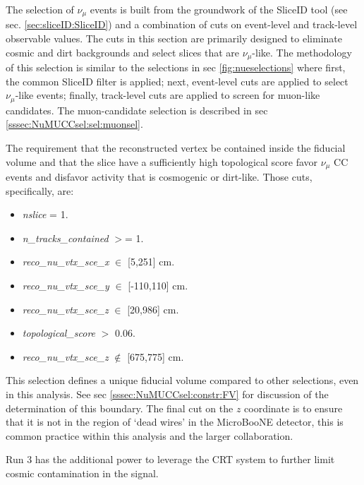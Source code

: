\par The selection of $\nu_{\mu}$ events is built from the groundwork of the SliceID tool (see sec. \ref{sec:sliceID:SliceID}) and a combination of cuts on event-level and track-level observable values. The cuts in this section are primarily designed to eliminate cosmic and dirt backgrounds and select slices that are $\nu_{\mu}$-like. The methodology of this selection is similar to the selections in sec \ref{fig:nueselections} where first, the common SliceID filter is applied; next, event-level cuts are applied to select $\nu_{\mu}$-like events; finally, track-level cuts are applied to screen for muon-like candidates. The muon-candidate selection is described in sec \ref{sssec:NuMUCCsel:sel:muonsel}.

\par The requirement that the reconstructed vertex be contained inside the fiducial volume and that the slice have a sufficiently high topological score favor $\nu_{\mu}$ CC events and disfavor activity that is cosmogenic or dirt-like. Those cuts, specifically, are:

\begin{itemize}
    \item \emph{nslice} = 1.
    \item \emph{n\_tracks\_contained} $>$= 1.
    \item \emph{reco\_nu\_vtx\_sce\_x} $\in$ [5,251] cm.
    \item \emph{reco\_nu\_vtx\_sce\_y} $\in$ [-110,110] cm.
    \item \emph{reco\_nu\_vtx\_sce\_z} $\in$ [20,986] cm.
    \item \emph{topological\_score} $>$ 0.06.
    \item \emph{reco\_nu\_vtx\_sce\_z} $\not\in$ [675,775] cm.
\end{itemize}

\par \noindent This selection defines a unique fiducial volume compared to other selections, even in this analysis. See sec \ref{sssec:NuMUCCsel:constr:FV} for discussion of the determination of this boundary. The final cut on the $z$ coordinate is to ensure that it is not in the region of `dead wires' in the MicroBooNE detector, this is common practice within this analysis and the larger collaboration.

\par \noindent Run 3 has the additional power to leverage the CRT system to further limit cosmic contamination in the signal.

